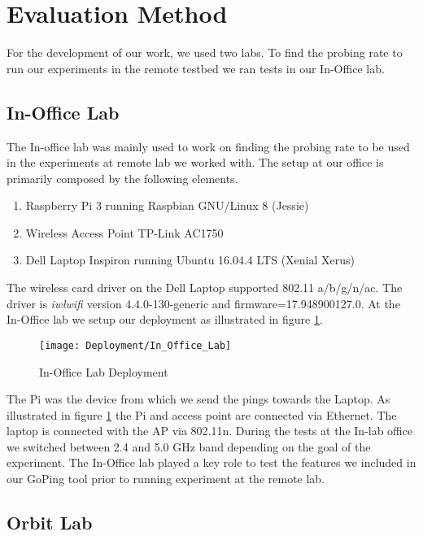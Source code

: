 \section{Evaluation Method}\label{Evaluation_Method}

For the development of our work, we used two labs. To find the probing rate to run our experiments in the remote testbed we ran tests in our In-Office lab.

\subsection*{In-Office Lab}

The In-office lab was mainly used to work on finding the probing rate to be used in the experiments at remote lab we worked with. The setup at our office is primarily composed by the following elements.

\begin{enumerate}
	\item Raspberry Pi 3 running Raspbian GNU/Linux 8 (Jessie)
	\item Wireless Access Point TP-Link AC1750
	\item Dell Laptop Inspiron running Ubuntu 16.04.4 LTS (Xenial Xerus)
\end{enumerate}

The wireless card driver on the Dell Laptop supported 802.11 a/b/g/n/ac. The driver is \textit{iwlwifi} version 4.4.0-130-generic and firmware=17.948900127.0. At the In-Office lab we setup our deployment as illustrated in figure \ref{image:In_Office_Lab_Deployment}.

\begin{figure}[h]
	\centering
	\texttt{[image: Deployment/In\_Office\_Lab]}
	\caption{In-Office Lab Deployment}
	\label{image:In_Office_Lab_Deployment}
\end{figure}

The Pi was the device from which we send the pings towards the Laptop. As illustrated in figure \ref{image:In_Office_Lab_Deployment} the Pi and access point are connected via Ethernet. The laptop is connected with the AP via 802.11n. During the tests at the In-lab office we switched between 2.4 and 5.0 GHz band depending on the goal of the experiment. The In-Office lab played a key role to test the features we included in our GoPing tool prior to running experiment at the remote lab.

\subsection*{Orbit Lab}

